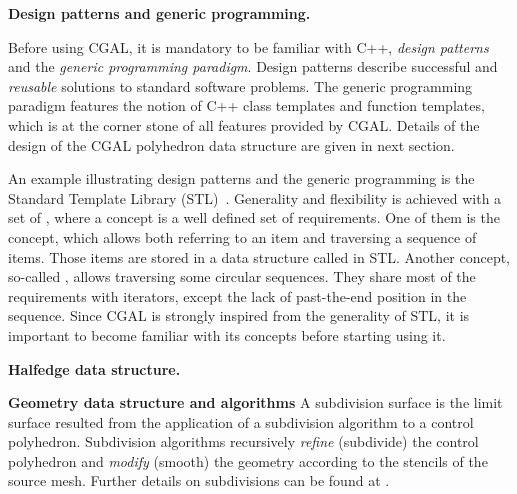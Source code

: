 
\noindent \textbf{Design patterns and generic programming.}

Before using CGAL, it is mandatory to be familiar with C++,
\emph{design patterns} and the \emph{generic programming paradigm}. 
Design patterns \cite{Gamma:1995:DP} describe successful and
\emph{reusable} solutions to standard software problems.  The generic
programming paradigm \cite{Alexandrescu:2001:MCD} features the notion
of C++ class templates and function templates, which is at the corner
stone of all features provided by CGAL. Details of the design of the
CGAL polyhedron data structure are given in next section.

An example illustrating design patterns and the generic programming is
the Standard Template Library (STL)~\cite{ms-stl-96}. Generality and
flexibility is achieved with a set of , where a
concept is a well defined set of requirements. One of them is the
 concept, which allows both referring to an item and
traversing a sequence of items. Those items are stored in a data
structure called  in STL. Another concept, so-called
, allows traversing some circular sequences. They
share most of the requirements with iterators, except the lack of
past-the-end position in the sequence. Since CGAL is strongly inspired
from the generality of STL, it is important to become familiar with
its concepts before starting using it.

\noindent \textbf{Halfedge data structure.}


\noindent \textbf{Geometry data structure and algorithms}
A subdivision surface is the limit surface resulted from the
application of a subdivision algorithm to a control polyhedron.
Subdivision algorithms recursively \emph{refine} (subdivide) the
control polyhedron and \emph{modify} (smooth) the geometry according
to the stencils of the source mesh.  
Further details on
subdivisions can be found at \cite{Sub:course:2000}.
